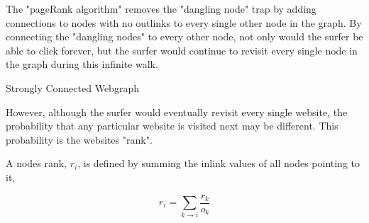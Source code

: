 \documentclass[12pt]{article}
\begin{document}
The "pageRank algorithm" removes the "dangling node" trap by adding connections to nodes with no outlinks to every single other node in the graph. By connecting the "dangling nodes" to every other node, not only would the surfer be able to click forever, but the surfer would continue to revisit every single node in the graph during this infinite walk. 

\begin{center}Strongly Connected Webgraph \end{center}

\begin{center}
\end{center}

However, although the surfer would eventually revisit every single website, the probability that any particular website is visited next may be different. This probability is the websites "rank". 

A nodes rank, $r_i$, is defined by summing the inlink values of all nodes pointing to it,

\begin{equation}
	\nonumber r_i = \sum_{k \rightarrow i} \frac{r_k}{o_k}
\end{equation}
\end{document}
